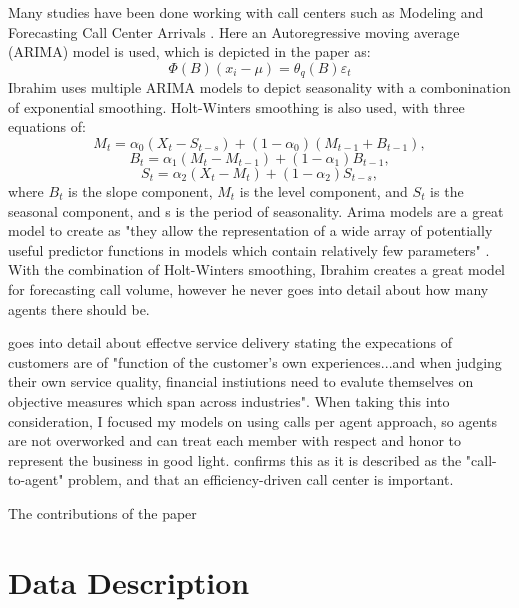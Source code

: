 \documentclass[12pt]{article}
\begin{document}
  Many studies have been done working with call centers such as Modeling and Forecasting Call Center Arrivals \citep{ibrahim2016modeling}.
Here an Autoregressive moving average (ARIMA) model is used, which is depicted in the paper as:
\begin{equation}
  \label{eq:ARIMA Standard}
  \Phi(B)(x_i -\mu)=\theta_q(B)\varepsilon_t
\end{equation}
Ibrahim uses multiple ARIMA models to depict seasonality with a combonination of exponential smoothing. Holt-Winters smoothing is also used,
with three equations of:
\begin{equation}
  \label{eq:Holt-Winters}
  M_t=\alpha_0(X_t-S_{t-s}) + (1-\alpha_0)(M_{t-1}+B_{t-1}),
\end{equation}
\begin{equation}
  \label{eq:Holt-Winters2}
  B_t=\alpha_1(M_t-M_{t-1}) +(1-\alpha_1)B_{t-1},
\end{equation}
\begin{equation}
  \label{eq:Holt-Winters3}
  S_t=\alpha_2(X_t-M_t) +(1-\alpha_2)S_{t-s},
\end{equation}
where $B_{t}$ is the slope component, $M_{t}$ is the level component, and $S_{t}$ is the seasonal component, and s is the period of seasonality.
Arima models are a great model to create as "they allow the  representation of a  wide array of potentially useful predictor functions in  models  which contain relatively few parameters" \citep{newbold1983arima}.
With the combination of Holt-Winters smoothing, Ibrahim creates a great model for forecasting call volume, however he never goes into detail about
how many agents there should be. 

  \citep{evensen1999effective} goes into detail about effectve service delivery stating the expecations of customers are of "function of
the customer's own experiences...and when judging their own service quality, financial instiutions need to evalute themselves on 
objective measures which span across industries". When taking this into consideration, I focused my models on using calls per agent approach,
so agents are not overworked and can treat each member with respect and honor to represent the business in good light. \citep{avramidis2005modeling} confirms
this as it is described as the "call-to-agent" problem, and that an efficiency-driven call center is important.


  The contributions of the paper


\section*{Data Description}
\end{document}
